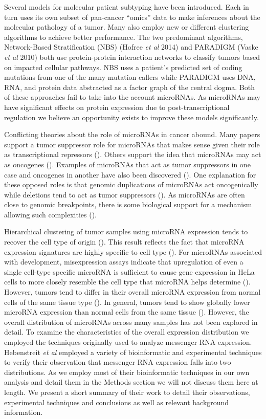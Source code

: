 \documentclass[12pt]{report}
\begin{document}
Several models for molecular patient subtyping have been introduced. Each in 
turn uses its own subset of pan-cancer ``omics'' data to make inferences about 
the molecular pathology of a tumor. Many also employ new or different clustering 
algorithms to achieve better performance. The two predominant algorithms, 
Network-Based Stratification (NBS) (Hofree \emph{et al} 2014) and PARADIGM (Vaske \emph{et al} 2010) 
both use protein-protein interaction networks to classify tumors based on 
impacted cellular pathways. NBS uses a patient's predicted set of coding 
mutations from one of the many mutation callers while PARADIGM uses DNA, RNA, 
and protein data abstracted as a factor graph of the central dogma. Both of 
these approaches fail to take into the account microRNAs. As microRNAs may have 
significant effects on protein expression due to post-transcriptional regulation 
we believe an opportunity exists to improve these models significantly.


Conflicting theories about the role of microRNAs in cancer abound. Many papers 
support a tumor suppressor role for microRNAs that makes sense given their role 
as transcriptional repressors (). Others support the idea that microRNAs may act 
as oncogenes (). Examples of microRNAs that act as tumor suppressors in one case 
and oncogenes in another have also been discovered ().
One explanation for these opposed roles is that genomic 
duplications of microRNAs act oncogenically while deletions tend to act as tumor 
suppressors (). As microRNAs are often close to genomic breakpoints, there is 
some biological support for a mechanism allowing such complexities ().

Hierarchical clustering of tumor samples using microRNA expression tends to recover the cell type of origin (). This 
result reflects the fact that microRNA expression signatures are highly specific 
to cell type (). For microRNAs associated with development,
misexpression assays indicate that upregulation of even a 
single cell-type specific microRNA is sufficient to cause gene expression in HeLa cells to 
more closely resemble the cell type that microRNA helps determine (). However, 
tumors tend to differ in their overall microRNA expression from normal cells of the same tissue 
type (). In general, tumors tend to show globally lower microRNA expression than 
normal cells from the same tissue (). However, the overall distribution of 
microRNAs across many samples has not been explored in detail. To examine the 
characteristics of the overall expression distribution we employed the 
techniques originally used to analyze messenger RNA expression.
Hebenstreit \emph{et al} employed a variety of bioinformatic and experimental 
techniques to verify their observation that messenger RNA expression falls into 
two distributions. As we employ most of their bioinformatic techniques in our 
own analysis and detail them in the Methods section we will not discuss them here at length.
We present a short summary of their work to detail their observations, experimental techniques 
and conclusions as well as relevant background information.
 
\end{document}
